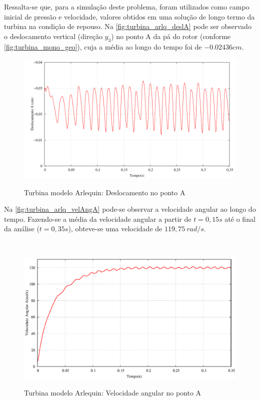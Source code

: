 Ressalta-se que, para a simulação deste problema, foram utilizados como campo inicial de pressão e velocidade, valores obtidos em uma solução de longo termo da turbina na condição de repouso. Na \autoref{fig:turbina_arlq_deslA} pode ser observado o deslocamento vertical (direção $y_3$) no ponto A da pá do rotor (conforme \autoref{fig:turbina_mono_geo}), cuja a média ao longo do tempo foi de $-0.02436cm$.

\begin{figure}[!htbp]
	\caption{Turbina modelo Arlequin: Deslocamento no ponto A}
	\centering 
	\includegraphics[scale=0.6,trim=0cm 0cm 0cm 0cm, clip=true]{Imagens/Cap7/turbina_arlq_deslocamento.pdf}	
	\label{fig:turbina_arlq_deslA}
\end{figure}

Na \autoref{fig:turbina_arlq_velAngA} pode-se observar a velocidade angular ao longo do tempo. Fazendo-se a média da velocidade angular a partir de $t=0,15s$ até o final da análise ($t=0,35s$), obteve-se uma velocidade de  $119,75 \ rad/s$.

\

\begin{figure}[!htbp]
	\caption{Turbina modelo Arlequin: Velocidade angular no ponto A}
	\centering 
	\includegraphics[scale=0.6,trim=0cm 0cm 0cm 0cm, clip=true]{Imagens/Cap7/turbina_arlq_velocidade_angular.eps}
	\label{fig:turbina_arlq_velAngA}
\end{figure}

